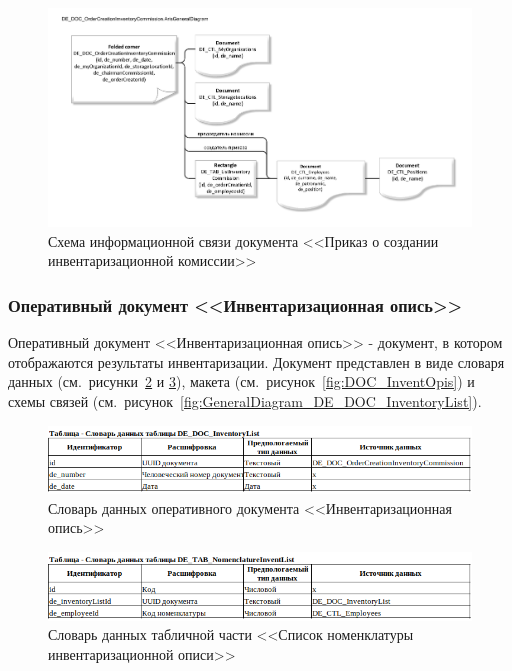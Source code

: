 \begin{figure}[!h]
    \centering
    \includegraphics[width=18cm]
        {assets/ARIS/GeneralDiagram/DE_DOC_OrderCreationImventoryCommission.ArisGeneralDiagram.pdf}
    \caption{Схема информационной связи документа <<Приказ о создании инвентаризационной комиссии>>}
    \label{fig:GeneralDiagram_DE_DOC_OrderCreationImventoryCommission}
\end{figure}

\newpage

\subsubsection{Оперативный документ <<Инвентаризационная опись>>}

Оперативный документ <<Инвентаризационная опись>>
- документ, в котором отображаются результаты инвентаризации.
Документ представлен в виде словаря данных (см.~рисунки~\ref{fig:InformationalModel_DE_DOC_InventoryList} и \ref{fig:InformationalModel_DE_TAB_NomenclatureInventList}),
макета (см.~рисунок~\ref{fig:DOC_InventOpis})
и схемы связей (см.~рисунок~\ref{fig:GeneralDiagram_DE_DOC_InventoryList}).

\begin{figure}[!h]
    \centering
    \includegraphics[width=16cm]
    {assets/InformationalModel/DE_DOC_InventoryList.png}
    \caption{Словарь данных оперативного документа <<Инвентаризационная опись>>}
    \label{fig:InformationalModel_DE_DOC_InventoryList}
\end{figure}

\begin{figure}[!h]
    \centering
    \includegraphics[width=16cm]
    {assets/InformationalModel/DE_TAB_NomenclatureInventList.png}
    \caption{Словарь данных табличной части <<Список номенклатуры инвентаризационной описи>>}
    \label{fig:InformationalModel_DE_TAB_NomenclatureInventList}
\end{figure}

